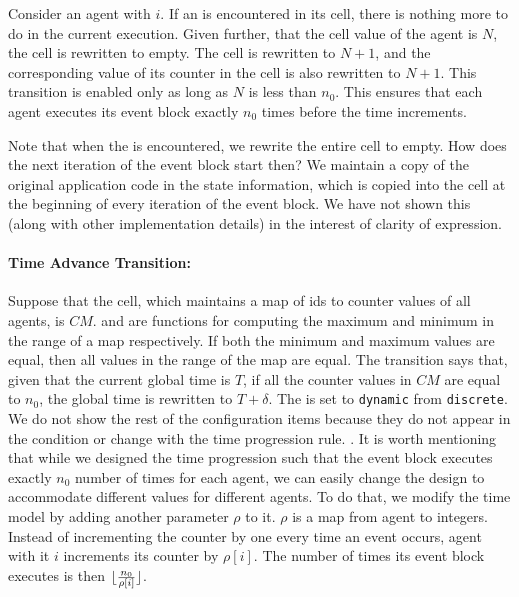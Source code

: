  Consider an agent with  $i$. If an  is encountered in its  cell, there is nothing more to do in the current execution. Given further, that the  cell value of the agent is $N$, the  cell is rewritten to empty. The  cell is rewritten to $N+1$, and the corresponding value of its counter in the  cell is also rewritten to $N+1$. This transition is enabled only as long as $N$ is less than $n_0$. This ensures that each agent executes its event block exactly $n_0$ times before the time increments. 
\vspace{-1mm}

Note that when the  is encountered, we rewrite the entire  cell to empty. How does the next iteration of the event block start then? We maintain a copy of the original application code in the state information, which is copied into the  cell at the beginning of every iteration of the event block. We have not shown this (along with other implementation details) in the interest of clarity of expression. 
\paragraph{Time Advance Transition:}
Suppose that the  cell, which maintains a map of ids to counter values of all agents, is $CM$.  and  are functions for computing the maximum and minimum in the range of a map respectively. If both the minimum and maximum values are equal, then all values in the range of the map are equal.  The  transition says that, given that the current global time is $T$, if all the counter values in $CM$ are equal to $n_0$, the global time is rewritten to $T+\delta$. The  is set to \verb|dynamic| from \verb|discrete|. We do not show the rest of the configuration items because they do not appear in the condition or change with the time progression rule. 
. 
\vspace{-4mm}
It is worth mentioning that while we designed the time progression such that the event block executes exactly $n_0$ number of times for each agent, we can easily change the design to accommodate different values for different agents. To do that, we modify the time model by adding another parameter $\rho$ to it. $\rho$ is a map from agent  to integers. Instead of incrementing the counter by one every time an event occurs, agent with it $i$ increments its counter by $\rho[i]$. The number of times its event block executes is then $\lfloor\frac{n_0}{\rho[i]}\rfloor$.


